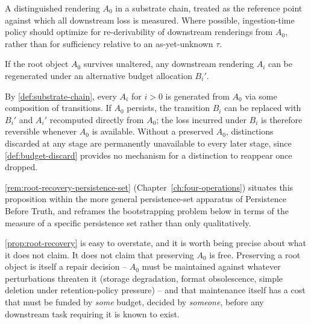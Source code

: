\begin{definition}
\label{def:root-object}
A distinguished rendering $A_0$ in a substrate chain, treated as the
reference point against which all downstream loss is measured. Where
possible, ingestion-time policy should optimize for re-derivability of
downstream renderings from $A_0$, rather than for sufficiency relative to
an as-yet-unknown $\tau$.
\end{definition}

\begin{proposition}
\label{prop:root-recovery}
If the root object $A_0$ survives unaltered, any downstream rendering
$A_i$ can be regenerated under an alternative budget allocation $B_i'$.
\end{proposition}

\begin{proofsketch}
By \cref{def:substrate-chain}, every $A_i$ for $i>0$ is generated from
$A_0$ via some composition of transitions. If $A_0$ persists, the
transition $B_i$ can be replaced with $B_i'$ and $A_i'$ recomputed
directly from $A_0$; the loss incurred under $B_i$ is therefore reversible
whenever $A_0$ is available. Without a preserved $A_0$, distinctions
discarded at any stage are permanently unavailable to every later stage,
since \cref{def:budget-discard} provides no mechanism for a distinction to
reappear once dropped.
\end{proofsketch}

\cref{rem:root-recovery-persistence-set} (Chapter~\ref{ch:four-operations})
situates this proposition within the more general persistence-set apparatus
of Persistence Before Truth, and reframes the bootstrapping problem below in
terms of the measure of a specific persistence set rather than only
qualitatively.

\cref{prop:root-recovery} is easy to overstate, and it is worth being
precise about what it does not claim. It does not claim that preserving
$A_0$ is free. Preserving a root object is itself a repair decision --
$A_0$ must be maintained against whatever perturbations threaten it
(storage degradation, format obsolescence, simple deletion under
retention-policy pressure) -- and that maintenance itself has a cost that
must be funded by \emph{some} budget, decided by \emph{someone}, before any
downstream task requiring it is known to exist.

